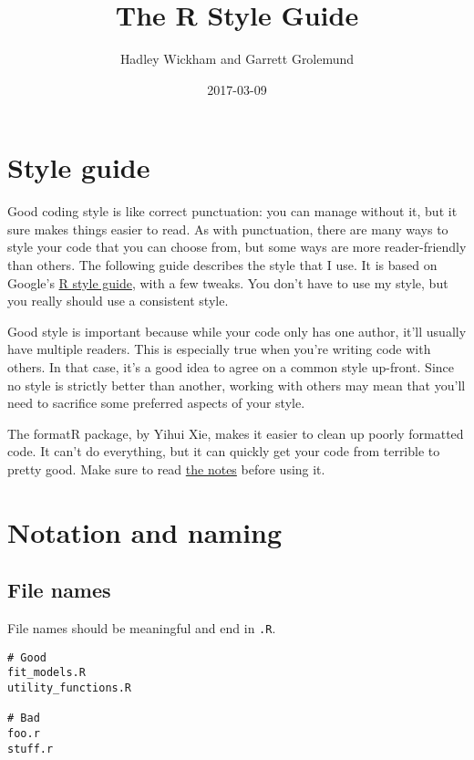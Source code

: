 \documentclass[]{book}
\title{The R Style Guide}
\author{Hadley Wickham and Garrett Grolemund}
\date{2017-03-09}
\begin{document}
\maketitle

{
\setcounter{tocdepth}{1}
\tableofcontents
}
\chapter{Style guide}\label{style}

Good coding style is like correct punctuation: you can manage without
it, but it sure makes things easier to read. As with punctuation, there
are many ways to style your code that you can choose from, but some ways
are more reader-friendly than others. The following guide describes the
style that I use. It is based on Google's
\href{http://google-styleguide.googlecode.com/svn/trunk/google-r-style.html}{R
style guide}, with a few tweaks. You don't have to use my style, but you
really should use a consistent style. 

Good style is important because while your code only has one author,
it'll usually have multiple readers. This is especially true when you're
writing code with others. In that case, it's a good idea to agree on a
common style up-front. Since no style is strictly better than another,
working with others may mean that you'll need to sacrifice some
preferred aspects of your style.

The formatR package, by Yihui Xie, makes it easier to clean up poorly
formatted code. It can't do everything, but it can quickly get your code
from terrible to pretty good. Make sure to read
\href{https://yihui.name/formatR/}{the notes} before using it.

\chapter{Notation and naming}\label{style-notnam}

\section{File names}\label{file-names}

File names should be meaningful and end in \texttt{.R}.

\begin{verbatim}
# Good
fit_models.R
utility_functions.R

# Bad
foo.r
stuff.r
\end{verbatim}
\end{document}
